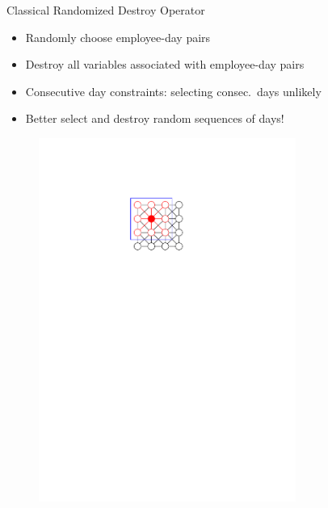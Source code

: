 \documentclass[aspectratio=1610]{beamer}
\newcommand{\important}[1]{{\color{green!60!black}#1}}
\begin{document}
\begin{frame}{Classical Randomized Destroy Operator}
	\begin{itemize}
		\item<1-2> \important{Randomly} choose employee-day pairs
		\item<1-2> Destroy all variables associated with \important{employee-day pairs}
		\item<3-> \important{Consecutive day constraints}: selecting consec.\ days unlikely
		\item<3-> Better select and destroy \important{random sequences} of days!
	\end{itemize}
	\begin{figure}
		\begin{overprint}
			\centering\includegraphics[width=0.75\textwidth, page=13]{figures/graphics.pdf}

\end{overprint}
\end{figure}
\end{frame}
\end{document}
